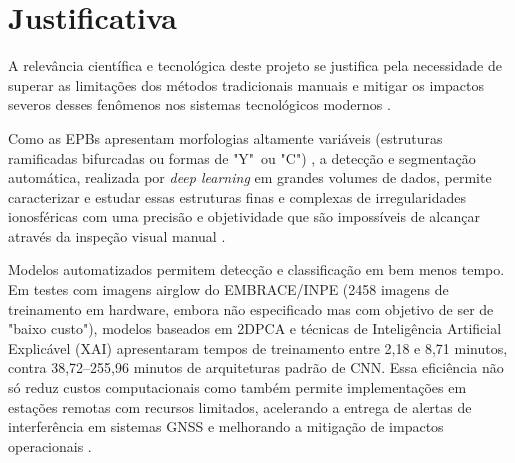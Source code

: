 \chapter{Justificativa}

A relevância científica e tecnológica deste projeto se justifica pela necessidade de superar as limitações dos métodos tradicionais manuais e mitigar os impactos severos desses fenômenos nos sistemas tecnológicos modernos \cite{Githio2024}.

Como as EPBs apresentam morfologias altamente variáveis (estruturas ramificadas bifurcadas ou formas de "Y"~ou "C") \cite{Githio2024}, a detecção e segmentação automática, realizada por \textit{deep learning} em grandes volumes de dados, permite caracterizar e estudar essas estruturas finas e complexas de irregularidades ionosféricas com uma precisão e objetividade que são impossíveis de alcançar através da inspeção visual manual \cite{Zhong2025}.

Modelos automatizados permitem detecção e classificação em bem menos tempo. Em testes com imagens airglow do EMBRACE/INPE (2458 imagens de treinamento em hardware, embora não especificado mas com objetivo de ser de "baixo custo"), modelos baseados em 2DPCA e técnicas de Inteligência Artificial Explicável (XAI) apresentaram tempos de treinamento entre 2,18 e 8,71 minutos, contra 38,72–255,96 minutos de arquiteturas padrão de CNN. Essa eficiência não só reduz custos computacionais como também permite implementações em estações remotas com recursos limitados, acelerando a entrega de alertas de interferência em sistemas GNSS e melhorando a mitigação de impactos operacionais \cite{Yacoub2025}.
